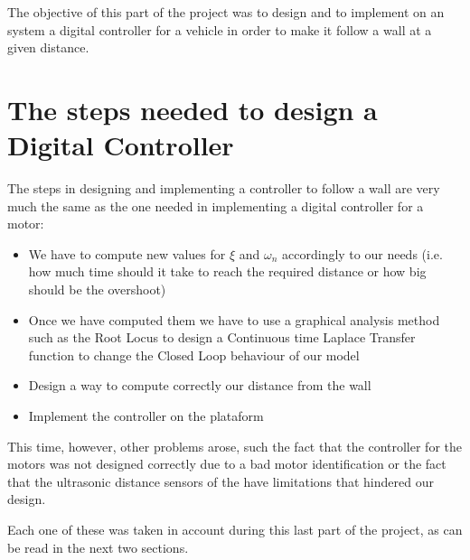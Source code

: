 The objective of this part of the project was to design and to implement on
an \nxtOSEK{} system a digital controller for a vehicle in order to make it
follow a wall at a given distance.

\section{The steps needed to design a Digital Controller}

  The steps in designing and implementing a controller to follow a wall are
  very much the same as the one needed in implementing a digital controller
  for a motor:
  
  \begin{itemize}
    
    \item{} We have to compute new values for $\xi$ and $\omega_n$
      accordingly to our needs (i.e. how much time should it take to reach
      the required distance or how big should be the overshoot)
    \item{} Once we have computed them we have to use a graphical analysis
      method such as the Root Locus to design a Continuous time Laplace
      Transfer function to change the Closed Loop behaviour of our model
    \item{} Design a way to compute correctly our distance from the wall
    \item{} Implement the controller on the plataform

  \end{itemize}

  This time, however, other problems arose, such the fact that the
  controller for the motors was not designed correctly due to a bad
  motor identification or the fact that the ultrasonic distance sensors of
  the \nxt{} have limitations that hindered our design.
  
  Each one of these was taken in account during this last part of the
  project, as can be read in the next two sections.
